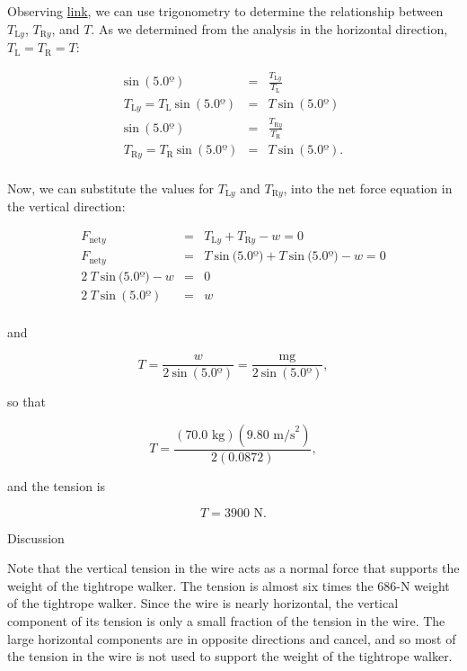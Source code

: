 \documentclass[
]{book}
\begin{document}
Observing \protect\hyperlink{import-auto-id1561864}{link}, we can
use trigonometry to determine the relationship between
\(T_{\text{L}y}{}\), \(T_{\text{R}y}{}\), and \(T{}\). As we determined from
the analysis in the horizontal direction,
\({{T_{\text{L}} = T_{\text{R}}} = T}{}\):

\leavevmode{}%
\[\begin{array}{lll}
{\text{sin}\ (5.0º)} & = & \frac{T_{\text{L}y}}{T_{\text{L}}} \\
{T_{\text{L}y} = T_{\text{L}}\ \text{sin}\ (5.0º)} & = & {T\ \text{sin}\ (5.0º)} \\
{\text{sin}\ (5.0º)} & = & \frac{T_{\text{R}y}}{T_{\text{R}}} \\
{T_{\text{R}y} = T_{\text{R}}\ \text{sin}\ (5.0º)} & = & {T\ \text{sin}\ (5.0º).} \\
\end{array}\]

Now, we can substitute the values for \(T_{\text{L}y}{}\) and
\(T_{\text{R}y}{}\), into the net force equation in the vertical
direction:

\leavevmode{}%
\[\begin{array}{lll}
F_{\text{net}y} & = & {T_{\text{L}y} + T_{\text{R}y} - w = 0} \\
F_{\text{net}y} & = & {T\ \text{sin}\ (5.0º{) + T\ }\text{sin}\ (5.0º{{) - w} = 0}} \\
{2\ T\ \text{sin}\ (5.0º{) - w}} & = & 0 \\
{2\ T\ \text{sin}\ (5.0º)} & = & w \\
\end{array}\]

and

\leavevmode{}%
\[{{T = \frac{w}{2\ \text{sin}\ (5.0º)}} = \frac{\text{mg}}{2\ \text{sin}\ (5.0º)}},\]

so that

\leavevmode{}%
\[{T = \frac{(\text{70}\text{.}\text{0\ kg})(9\text{.}\text{80\ m/s}^{2})}{2(0\text{.}\text{0872})}},\]

and the tension is

\leavevmode{}%
\[{T = \text{3900\ N}}.\]

{Discussion}

Note that the vertical tension in the wire acts as a normal force that
supports the weight of the tightrope
walker.\textbf{} The tension is almost six
times the 686-N weight of the tightrope walker. Since the wire is nearly
horizontal, the vertical component of its tension is only a small
fraction of the tension in the wire. The large horizontal components are
in opposite directions and cancel, and so most of the tension in the
wire is not used to support the weight of the tightrope walker.
\end{document}
